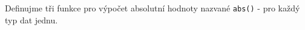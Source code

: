 \begin{mdframed}[style=mdexam]
  \begin{example}\label{cpp:exam007}
    Definujme tři funkce pro výpočet absolutní hodnoty nazvané \lstinline[style=luaCPPText]!abs()! -
    pro každý typ dat jednu.
    
  \end{example}
\end{mdframed}